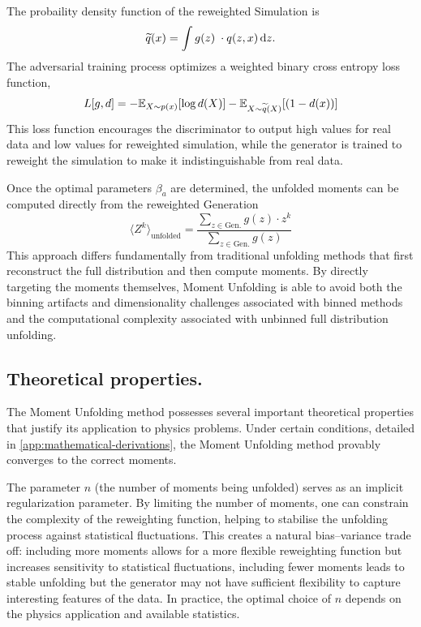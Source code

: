         The probaility density function of the reweighted Simulation is
        \[
            \widetilde{q}(x) = \int g(z)\; \cdot q(z, x) \, \dd z.
        \]
        The adversarial training process optimizes a weighted binary cross entropy loss function,
        \[
            L[g,d] = -\mathbb{E}_{X \sim p(x)}[\log d(X)] - \mathbb{E}_{X \sim\widetilde{q}(X) }[(1-d(x))]
        \]
        This loss function encourages the discriminator to output high values for real data and low values for reweighted simulation, while the generator is trained to reweight the simulation to make it indistinguishable from real data.

        Once the optimal parameters $\beta_a$ are determined, the unfolded moments can be computed directly from the reweighted Generation
        \[
            \langle Z^k \rangle_{\text{unfolded}} = \frac{\sum_{z \in \text{Gen.}} g(z) \cdot z^k}{\sum_{z \in \text{Gen.}} g(z)}
        \]
        This approach differs fundamentally from traditional unfolding methods that first reconstruct the full distribution and then compute moments.
        By directly targeting the moments themselves, Moment Unfolding is able to avoid both the binning artifacts and dimensionality challenges associated with binned methods and the computational complexity associated with unbinned full distribution unfolding.
    \subsection{Theoretical properties.}
        The Moment Unfolding method possesses several important theoretical properties that justify its application to physics problems.
        Under certain conditions, detailed in \cref{app:mathematical-derivations}, the Moment Unfolding method provably converges to the correct moments.

        The parameter $n$ (the number of moments being unfolded) serves as an implicit regularization parameter.
        By limiting the number of moments, one can constrain the complexity of the reweighting function, helping to stabilise the unfolding process against statistical fluctuations.
        This creates a natural bias--variance trade off: including more moments allows for a more flexible reweighting function but increases sensitivity to statistical fluctuations, including fewer moments leads to stable unfolding but the generator may not have sufficient flexibility to capture interesting features of the data.
        In practice, the optimal choice of $n$ depends on the physics application and available statistics.
        
